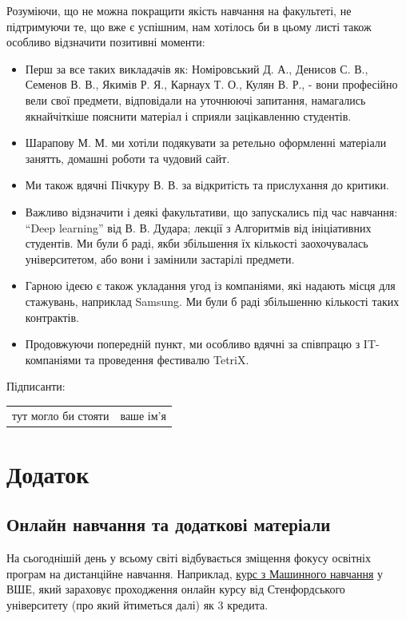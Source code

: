 \documentclass[14pt, a4paper]{extarticle}  %
\begin{document}
Розуміючи, що не можна покращити якість навчання на факультеті, не підтримуючи те, що вже є успішним, нам хотілось би в цьому листі також особливо  відзначити позитивні моменти:
\begin{itemize}
    \item Перш за все таких викладачів як: Номіровський Д. А., Денисов С. В., Семенов В. В., Якимів Р. Я., Карнаух Т. О., Кулян В. Р., - вони професійно вели свої предмети, відповідали на уточнюючі запитання, намагались якнайчіткіше пояснити матеріал і сприяли зацікавленню студентів. 

\item Шарапову М. М.  ми хотіли подякувати за ретельно оформленні матеріали занятть, домашні роботи та чудовий сайт. 

\item Ми також вдячні Пічкуру В. В. за відкритість та прислухання до критики.

\item Важливо відзначити і деякі факультативи, що запускались під час навчання: ``Deep learning'' від В. В. Дудара; лекції з Алгоритмів від ініціативних студентів. Ми були б раді, якби збільшення їх кількості заохочувалась університетом, або вони і замінили застарілі предмети.

\item Гарною ідеєю є також укладання угод із компаніями, які надають місця для стажувань, наприклад Samsung. Ми були б раді збільшенню кількості таких контрактів.

\item Продовжуючи попередній пункт, ми особливо вдячні за співпрацю з IT-компаніями та проведення фестивалю TetriX. 
\end{itemize}

\newpage
Підписанти:

\begin{tabular}{c|c}
\hline
тут могло би стояти & ваше ім'я \\
\end{tabular}


\newpage\section{Додаток}

\subsection{Онлайн навчання та додаткові матеріали}
\label{Additional materials}
На сьогоднішій день у всьому світі відбувається зміщення фокусу освітніх програм на дистанційне навчання. Наприклад, \href{https://www.hse.ru/ba/am/courses/219906616.html}{курс з Машинного навчання} у ВШЕ, який зараховує проходження онлайн курсу від Стенфордського університету (про який йтиметься далі) як 3 кредита.
\end{document}
